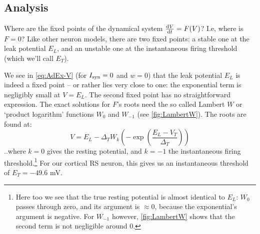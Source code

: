 



\subsection{Analysis}

Where are the fixed points of the dynamical system $\frac{\mathrm{d}V}{\mathrm{d}t} = F(V)$? I.e, where is $F = 0$? Like other neuron models, there are two fixed points: a stable one at the leak potential $E_L$, and an unstable one at the instantaneous firing threshold (which we'll call $E_T$).

We see in \cref{eq:AdEx-V} (for $I_{\text{syn}} = 0$ and $w = 0$) that the leak potential $E_L$ is indeed a fixed point -- or rather lies very close to one: the exponential term is negligibly small at $V = E_L$.
The second fixed point has no straightforward expression. The exact solutions for $F$'s roots need the so called Lambert $W$ or `product logarithm' functions $W_0$ and $W_{-1}$ (see \cref{fig:LambertW}). The roots are found at:
\begin{equation}
    V = E_L - Δ_T W_k \left( -\exp\left( \frac{E_L - V_T}{Δ_T} \right) \right) \label{eq:LambertW}
\end{equation}
..where $k = 0$ gives the resting potential, and $k = -1$ the instantaneous firing threshold.\footnote{
    Here too we see that the true resting potential is almost identical to $E_L$: $W_0$ passes through zero, and its argument is $≈ 0$, because the exponential's argument is negative. For $W_{-1}$ however, \cref{fig:LambertW} shows that the second term is not negligible around $0$.}
For our cortical RS neuron, this gives us an instantaneous threshold of $E_T = -49.6$ mV.

